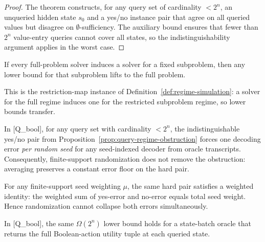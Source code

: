 \begin{proof}
The theorem  constructs, for any query set of cardinality $<2^n$, an unqueried hidden state $s_0$ and a yes/no instance pair that agree on all queried values but disagree on $\emptyset$-sufficiency. The auxiliary bound  ensures that fewer than $2^n$ value-entry queries cannot cover all states, so the indistinguishability argument applies in the worst case.
\end{proof}

\begin{proposition}\label{prop:query-subproblem-transfer}
If every full-problem solver induces a solver for a fixed subproblem, then any lower bound for that subproblem lifts to the full problem.
\end{proposition}

This is the restriction-map instance of Definition~\ref{def:regime-simulation}: a solver for the full regime induces one for the restricted subproblem regime, so lower bounds transfer.

\begin{proposition}\label{prop:query-randomized-robustness}
In [Q\_bool], for any query set with cardinality $<2^n$, the indistinguishable yes/no pair from Proposition~\ref{prop:query-regime-obstruction} forces one decoding error \emph{per random seed} for any seed-indexed decoder from oracle transcripts.
Consequently, finite-support randomization does not remove the obstruction: averaging preserves a constant error floor on the hard pair.
\end{proposition}

\begin{proposition}\label{prop:query-randomized-weighted}
For any finite-support seed weighting $\mu$, the same hard pair satisfies a weighted identity:
the weighted sum of yes-error and no-error equals total seed weight. Hence randomization cannot collapse both errors simultaneously.
\end{proposition}

\begin{proposition}\label{prop:query-state-batch-lb}
In [Q\_bool], the same $\Omega(2^n)$ lower bound holds for a state-batch oracle that returns the full Boolean-action utility tuple at each queried state.
\end{proposition}

